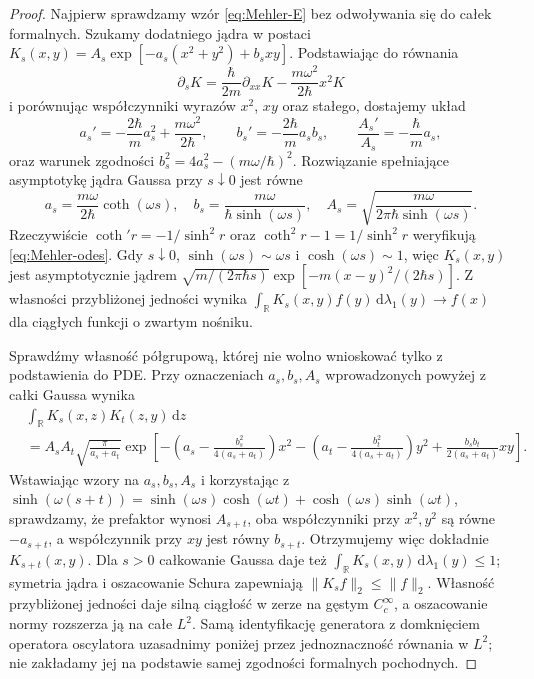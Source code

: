 \documentclass[11pt,a4paper,oneside]{report}
\numberwithin{equation}{chapter}
\theoremstyle{plain}
\theoremstyle{definition}
\theoremstyle{remark}
\newcommand{\R}{\mathbb{R}}
\newcommand{\dd}{\mathrm{d}}
\begin{document}
\begin{proof}
Najpierw sprawdzamy wzór \eqref{eq:Mehler-E}
bez odwoływania się do całek formalnych.
Szukamy dodatniego jądra w postaci
$K_s(x,y)=A_s\exp[-a_s(x^2+y^2)+b_sxy]$.
Podstawiając do równania
\[
 \partial_sK=\frac{\hbar}{2m}\partial_{xx}K
    -\frac{m\omega^2}{2\hbar}x^2K
\]
i porównując współczynniki wyrazów $x^2$, $xy$
oraz stałego, dostajemy układ
\[
 a_s'= -\frac{2\hbar}{m}a_s^2+
       \frac{m\omega^2}{2\hbar},\qquad
 b_s'=-\frac{2\hbar}{m}a_sb_s,\qquad
 \frac{A_s'}{A_s}=-\frac{\hbar}{m}a_s,
\tag{16.11}\label{eq:Mehler-odes}
\]
oraz warunek zgodności
$b_s^2=4a_s^2-(m\omega/\hbar)^2$.
Rozwiązanie spełniające asymptotykę jądra Gaussa
przy $s\downarrow0$ jest równe
\[
 a_s=\frac{m\omega}{2\hbar}\coth(\omega s),\quad
 b_s=\frac{m\omega}{\hbar\sinh(\omega s)},\quad
 A_s=\sqrt{\frac{m\omega}{2\pi\hbar\sinh(\omega s)}}.
\]
Rzeczywiście $\coth' r=-1/\sinh^2r$ oraz
$\coth^2r-1=1/\sinh^2r$ weryfikują
\eqref{eq:Mehler-odes}. Gdy $s\downarrow0$,
$\sinh(\omega s)\sim\omega s$ i
$\cosh(\omega s)\sim1$, więc $K_s(x,y)$ jest
asymptotycznie jądrem
$\sqrt{m/(2\pi\hbar s)}
\exp[-m(x-y)^2/(2\hbar s)]$.
Z własności przybliżonej jedności wynika
$\int_{\R} K_s(x,y)f(y)\,\dd\lambda_1(y)\to f(x)$
dla ciągłych funkcji o zwartym nośniku.

Sprawdźmy własność półgrupową, której nie wolno
wnioskować tylko z podstawienia do PDE. Przy oznaczeniach
$a_s,b_s,A_s$ wprowadzonych powyżej z całki Gaussa wynika
\[
\begin{split}
&\int_{\R}K_s(x,z)K_t(z,y)\,\dd z\\
&=A_sA_t\sqrt{\frac{\pi}{a_s+a_t}}
\exp\!\left[-\left(a_s-\frac{b_s^2}{4(a_s+a_t)}\right)x^2
-\left(a_t-\frac{b_t^2}{4(a_s+a_t)}\right)y^2
+\frac{b_sb_t}{2(a_s+a_t)}xy\right].
\end{split}
\]
Wstawiając wzory na $a_s,b_s,A_s$ i korzystając z
$\sinh(\omega(s+t))=\sinh(\omega s)\cosh(\omega t)
+\cosh(\omega s)\sinh(\omega t)$, sprawdzamy, że
prefaktor wynosi $A_{s+t}$, oba współczynniki przy
$x^2,y^2$ są równe $-a_{s+t}$, a współczynnik przy
$xy$ jest równy $b_{s+t}$. Otrzymujemy więc dokładnie
$K_{s+t}(x,y)$.
Dla $s>0$ całkowanie Gaussa daje też
$\int_{\R} K_s(x,y)\,\dd\lambda_1(y)\le1$; symetria jądra i
oszacowanie Schura zapewniają
$\|K_sf\|_2\le\|f\|_2$.
Własność przybliżonej jedności daje silną ciągłość
w zerze na gęstym $C_c^\infty$, a oszacowanie normy
rozszerza ją na całe $L^2$. Samą identyfikację
generatora z domknięciem operatora oscylatora
uzasadnimy poniżej przez jednoznaczność równania
w $L^2$; nie zakładamy jej na podstawie samej
zgodności formalnych pochodnych.


\end{proof}
\end{document}
